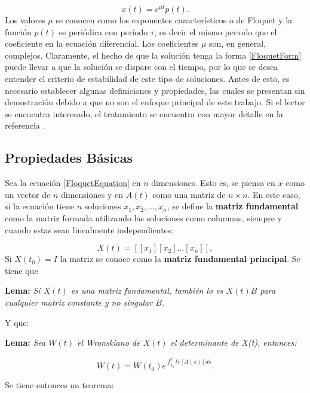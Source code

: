 \documentclass[a4paper,10pt]{report}
\begin{document}
\begin{equation}\label{FloquetForm}
x(t)=e^{\mu t}p(t).
\end{equation} Los valores $\mu$ se conocen como los exponentes característicos o de Floquet y la función $p(t)$ es periódica con período $\tau$, es decir el mismo periodo que el coeficiente en la ecuación diferencial. Los coeficientes $\mu$ son, en general, complejos. Claramente, el hecho de que la solución tenga la forma \ref{FloquetForm} puede llevar a que la solución se dispare con el tiempo, por lo que se desea entender el criterio de estabilidad de este tipo de soluciones. Antes de esto, es necesario establecer algunas definiciones y propiedades, las cuales se presentan sin demostración debido a que no son el enfoque principal de este trabajo. Si el lector se encuentra interesado, el tratamiento se encuentra con mayor detalle en la referencia \cite{WardFT}.\linebreak

\subsection{Propiedades Básicas}

Sea la ecuación \ref{FloquetEquation} en $n$ dimensiones. Esto es, se piensa en $x$ como un vector de $n$ dimensiones y en $A(t)$ como una matriz de $n \times n$. En este caso, si la ecuación tiene $n$ soluciones $x_1, x_2, ... , x_n$, se define la \textbf{matriz fundamental} como la matriz formada utilizando las soluciones como columnas, siempre y cuando estas sean linealmente independientes:

\begin{equation}
X(t) = [[x_1][x_2]...[x_n]],
\end{equation}Si $X(t_0) = I$ la matriz se conoce como la \textbf{matriz fundamental principal}. Se tiene que

\begin{center}
\textbf{Lema:} \textit{Si $X(t)$ es una matriz fundamental, también lo es $X(t)B$ para cualquier matriz constante y no singular $B$.}
\end{center}Y que:

\begin{center}
\textbf{Lema:} \textit{Sea $W(t)$ el Wronskiano de $X(t)$ el determinante de X(t), entonces:}

\begin{equation}
W(t) = W(t_0) e^{\int_{t_0}^{t}tr[A(s)]ds}.
\end{equation}
 
\end{center} Se tiene entonces un teorema:
\end{document}
